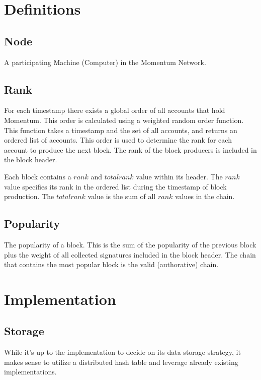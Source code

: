 \documentclass[conference]{IEEEtran}
\begin{document}
\section{Definitions}

\subsection{Node}

A participating Machine (Computer) in the Momentum Network. 

\subsection{Rank}

For each timestamp there exists a global order of all accounts that hold Momentum. This order is calculated using a weighted random order function.
This function takes a timestamp and the set of all accounts, and returns an ordered list of accounts.
This order is used to determine the rank for each account to produce the next block. The rank of the block producers is included
in the block header.

Each block contains a $rank$ and $total rank$ value within its header. The $rank$ value specifies its rank in the ordered list during the timestamp of block production.
The $total rank$ value is the sum of all $rank$ values in the chain.


\subsection{Popularity}

The popularity of a block. This is the sum of the popularity of the previous block plus the weight of all collected signatures included in the block header.
The chain that contains the most popular block is the valid (authorative) chain.


\section{Implementation}


\subsection{Storage}
While it's up to the implementation to decide on its data storage strategy, it makes sense to utilize a distributed hash table and leverage already existing implementations.
\end{document}
